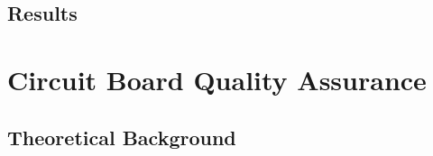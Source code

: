 \documentclass[a4paper,12pt]{article}
\begin{document}
\subsection{Results}




\newpage

\section{Circuit Board Quality Assurance}

\subsection{Theoretical Background}

\end{document}
